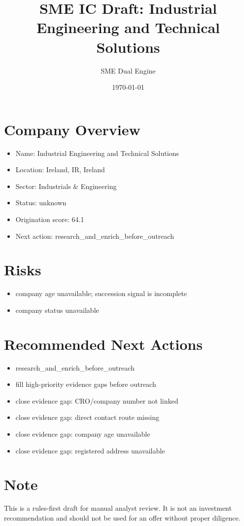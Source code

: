 \documentclass[11pt,a4paper]{article}
\title{SME IC Draft: Industrial Engineering and Technical Solutions}
\author{SME Dual Engine}
\date{\today}
\begin{document}
\maketitle
\section*{Company Overview}
\begin{itemize}[leftmargin=1.4em]
\item Name: Industrial Engineering and Technical Solutions
\item Location: Ireland, IR, Ireland
\item Sector: Industrials \& Engineering
\item Status: unknown
\item Origination score: 64.1
\item Next action: research\_and\_enrich\_before\_outreach
\end{itemize}
\section*{Risks}
\begin{itemize}[leftmargin=1.4em]
\item company age unavailable; succession signal is incomplete
\item company status unavailable
\end{itemize}
\section*{Recommended Next Actions}
\begin{itemize}[leftmargin=1.4em]
\item research\_and\_enrich\_before\_outreach
\item fill high-priority evidence gaps before outreach
\item close evidence gap: CRO/company number not linked
\item close evidence gap: direct contact route missing
\item close evidence gap: company age unavailable
\item close evidence gap: registered address unavailable
\end{itemize}
\section*{Note}
This is a rules-first draft for manual analyst review. It is not an investment
recommendation and should not be used for an offer without proper diligence.
\end{document}
